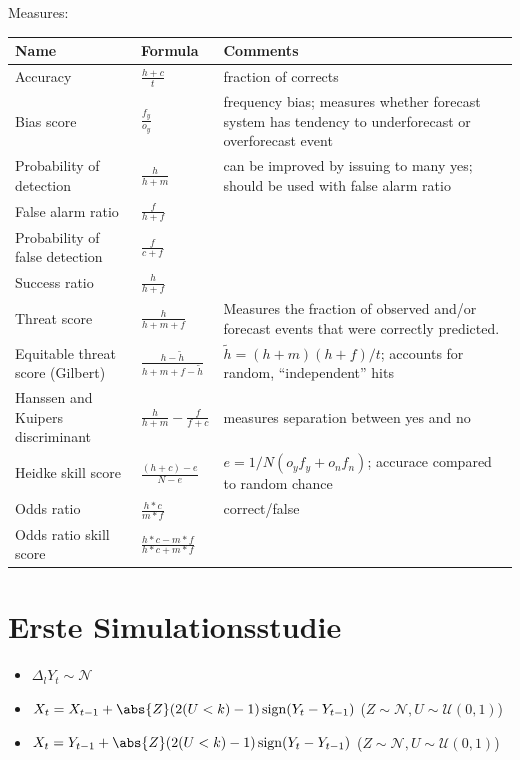 \documentclass{article}
\theoremstyle{plain}%
\theoremstyle{definition}
\newcommand{\lag}[1][l]{\Delta_{#1}}
\DeclarePairedDelimiter{\abs}\lvert\rvert
\DeclareMathOperator{\sign}{sign}
\begin{document}
\vspace{.7cm}

Measures:

\vspace{.7cm}

\noindent\begin{tabularx}{\textwidth}{l l X}
	\toprule
	Name & Formula & Comments \\
	\midrule
	Accuracy & $\frac{h + c}{t}$ & fraction of corrects \\
	Bias score & $\frac{f_y}{o_y}$ & frequency bias; measures whether forecast system has tendency to underforecast or overforecast event \\
	Probability of detection & $\frac{h}{h + m}$ & can be improved by issuing to many yes; should be used with false alarm ratio\\
	False alarm ratio & $\frac{f}{h + f}$ & \\
	Probability of false detection & $\frac{f}{c + f}$ & \\
	Success ratio & $\frac{h}{h+f}$ & \\
	Threat score & $\frac{h}{h + m + f}$ & Measures the fraction of observed and/or forecast events that were correctly predicted.\\
	Equitable threat score (Gilbert) & $\frac{h - \tilde{h}}{h + m + f - \tilde{h}}$ & $\tilde{h} = (h+m)(h+f) / t$; accounts for random, \enquote{independent} hits\\
	Hanssen and Kuipers discriminant & $\frac{h}{h+m} - \frac{f}{f + c}$ & measures separation between yes and no\\
	Heidke skill score & $\frac{(h+c) - e}{N - e}$ & $e = 1/N (o_y f_y + o_n f_n)$; accurace compared to random chance \\
	Odds ratio & $\frac{h*c}{m*f}$ & correct/false\\
	Odds ratio skill score & $\frac{h*c - m*f}{h*c + m*f}$ & \\ 
	\bottomrule
\end{tabularx}

\newpage
\section{Erste Simulationsstudie}
\begin{itemize}
    \item $\lag Y_t \sim \mathcal{N}$
    \item $X_t = X_{t-1} + \abs{Z} (2 (U < k) - 1) \sign(Y_t - Y_{t-1})$ ($Z \sim \mathcal{N}, U \sim \mathcal{U}(0, 1)$) 
    \item $X_t = Y_{t-1} + \abs{Z} (2 (U < k) - 1) \sign(Y_t - Y_{t-1})$ ($Z \sim \mathcal{N}, U \sim \mathcal{U}(0, 1)$)
\end{itemize}
\end{document}
